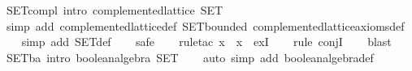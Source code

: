 \begin{isabellebody}
\endisatagproof
{\isafoldproof}%
%
\isadelimproof
\isanewline
%
\endisadelimproof
\isanewline
{}\isamarkupfalse%
\ SET{}compl\ {}intro{}{}\ {}complemented{}lattice\ SET{}\isanewline
%
\isadelimproof
\ \ %
\endisadelimproof
%
\isatagproof
{}\isamarkupfalse%
\ {}simp\ add{}\ complemented{}lattice{}def\ SET{}bounded\ complemented{}lattice{}axioms{}def{}\isanewline
\ \ \isamarkupfalse%
\ {}simp\ add{}\ SET{}def{}\isanewline
\ \ \isamarkupfalse%
\ safe\isanewline
\ \ \isamarkupfalse%
\ {}rule{}tac\ x\ {}\ {}{}x{}\ \ exI{}\isanewline
\ \ \isamarkupfalse%
\ {}rule\ conjI{}\isanewline
\ \ \isamarkupfalse%
\ blast{}%
\endisatagproof
{\isafoldproof}%
%
\isadelimproof
\isanewline
%
\endisadelimproof
\isanewline
{}\isamarkupfalse%
\ SET{}ba\ {}intro{}{}\ {}boolean{}algebra\ SET{}\isanewline
%
\isadelimproof
\ \ %
\endisadelimproof
%
\isatagproof
{}\isamarkupfalse%
\ {}auto\ simp\ add{}\ boolean{}algebra{}def{}%
\endisatagproof
{\isafoldproof}%
%
\isadelimproof
\isanewline
%
\endisadelimproof

\end{isabellebody}
